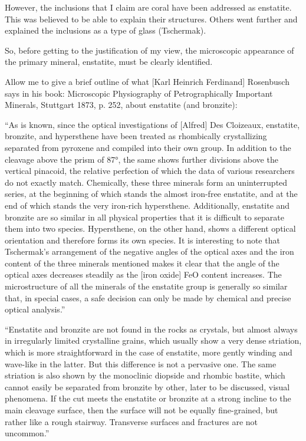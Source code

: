 \documentclass[a4paper, 11pt, oneside]{article}
\begin{document}
However, the inclusions that I claim are coral have been addressed as enstatite. This was believed to be able to explain their structures. Others went further and explained the inclusions as a type of glass (Tschermak).

So, before getting to the justification of my view, the microscopic appearance of the primary mineral, enstatite, must be clearly identified.

Allow me to give a brief outline of what [Karl Heinrich Ferdinand] Rosenbusch says in his book: Microscopic Physiography of Petrographically Important Minerals, Stuttgart 1873, p. 252, about enstatite (and bronzite):

``As is known, since the optical investigations of [Alfred] Des Cloizeaux, enstatite, bronzite, and hypersthene have been treated as rhombically crystallizing separated from pyroxene and compiled into their own group. In addition to the cleavage above the prism of 87°, the same shows further divisions above the vertical pinacoid, the relative perfection of which the data of various researchers do not exactly match. Chemically, these three minerals form an uninterrupted series, at the beginning of which stands the almost iron-free enstatite, and at the end of which stands the very iron-rich hypersthene. Additionally, enstatite and bronzite are so similar in all physical properties that it is difficult to separate them into two species. Hypersthene, on the other hand, shows a different optical orientation and therefore forms its own species. It is interesting to note that Tschermak's arrangement of the negative angles of the optical axes and the iron content of the three minerals mentioned makes it clear that the angle of the optical axes decreases steadily as the [iron oxide] FeO content increases. The microstructure of all the minerals of the enstatite group is generally so similar that, in special cases, a safe decision can only be made by chemical and precise optical analysis.''

``Enstatite and bronzite are not found in the rocks as crystals, but almost always in irregularly limited crystalline grains, which usually show a very dense striation, which is more straightforward in the case of enstatite, more gently winding and wave-like in the latter. But this difference is not a pervasive one. The same striation is also shown by the monoclinic diopside and rhombic bastite, which cannot easily be separated from bronzite by other, later to be discussed, visual phenomena. If the cut meets the enstatite or bronzite at a strong incline to the main cleavage surface, then the surface will not be equally fine-grained, but rather like a rough stairway. Transverse surfaces and fractures are not uncommon.''
\end{document}
